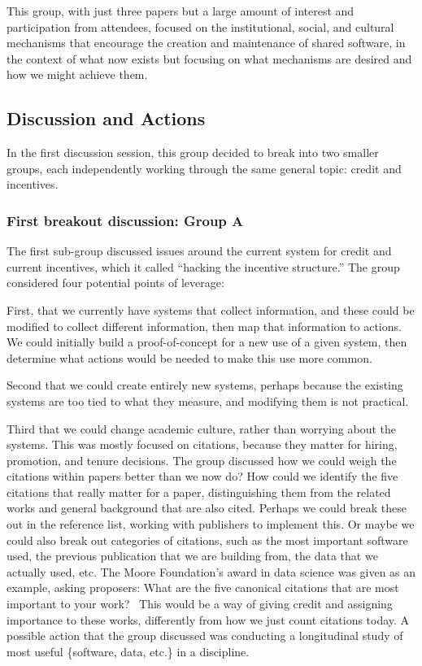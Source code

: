 \documentclass[11pt, oneside]{amsart}
\begin{document}
This group, with just three papers but a large amount of interest and
participation from attendees, focused on the institutional, social, and cultural
mechanisms that encourage the creation and maintenance of shared software, in the
context of what now exists but focusing on what mechanisms are desired and how
we might achieve them.


\subsection{Discussion and Actions}

In the first discussion session, this group decided to break into two smaller groups,
each independently working through the same general topic: credit and incentives.

\subsubsection{First breakout discussion: Group A}
The first sub-group discussed issues around the current system for credit and
current incentives, which it called ``hacking the incentive structure.'' The
group considered four potential points of leverage:

First, that we currently have systems that collect information, and these could
be modified to collect different information, then map that information to
actions. We could initially build a proof-of-concept for a new use of a given
system, then determine what actions would be needed to make this use more
common.

Second that we could create entirely new systems, perhaps because the existing
systems are too tied to what they measure, and modifying them is not practical.

Third that we could change academic culture, rather than worrying about the
systems. This was mostly focused on citations, because they matter for hiring,
promotion, and tenure decisions. The group discussed how we could weigh the
citations within papers better than we now do? How could we identify the five
citations that really matter for a paper, distinguishing them from the related
works and general background that are also cited. Perhaps we could break these
out in the reference list, working with publishers to implement this. Or maybe
we could also break out categories of citations, such as the most important
software used, the previous publication that we are building from, the data that
we actually used, etc. The Moore Foundation's award in data science was given as
an example, asking proposers: What are the five canonical citations that are
most important to your work?~\cite{moore-canonical} This would be a way of
giving credit and assigning importance to these works, differently from how we
just count citations today. A possible action that the group discussed was
conducting a longitudinal study of
most useful \{software, data, etc.\} in a discipline.
\end{document}
